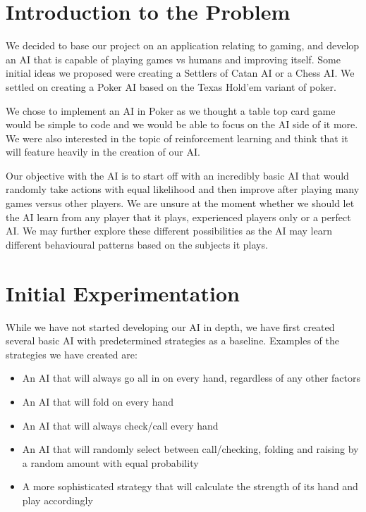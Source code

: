 \documentclass{article}
\begin{document}
\begin{multicols*}{2}
\section{Introduction to the Problem}
We decided to base our project on an application relating to gaming, and develop an AI that is capable of playing games vs humans and improving itself. Some initial ideas we proposed were creating a Settlers of Catan AI or a Chess AI. We settled on creating a Poker AI based on the Texas Hold'em variant of poker.
\newline

We chose to implement an AI in Poker as we thought a table top card game would be simple to code and we would be able to focus on the AI side of it more. We were also interested in the topic of reinforcement learning and think that it will feature heavily in the creation of our AI.

Our objective with the AI is to start off with an incredibly basic AI that would randomly take actions with equal likelihood and then improve after playing many games versus other players. We are unsure at the moment whether we should let the AI learn from any player that it plays, experienced players only or a perfect AI. We may further explore these different possibilities as the AI may learn different behavioural patterns based on the subjects it plays.





\section{Initial Experimentation}
While we have not started developing our AI in depth, we have first created several basic AI with predetermined strategies as a baseline. Examples of the strategies we have created are:

\begin{itemize}
    \item An AI that will always go all in on every hand, regardless of any other factors
    \item An AI that will fold on every hand
    \item An AI that will always check/call every hand
    \item An AI that will randomly select between call/checking, folding and raising by a random amount with equal probability
    \item A more sophisticated strategy that will calculate the strength of its hand and play accordingly
\end{itemize}


\end{multicols*}
\end{document}

